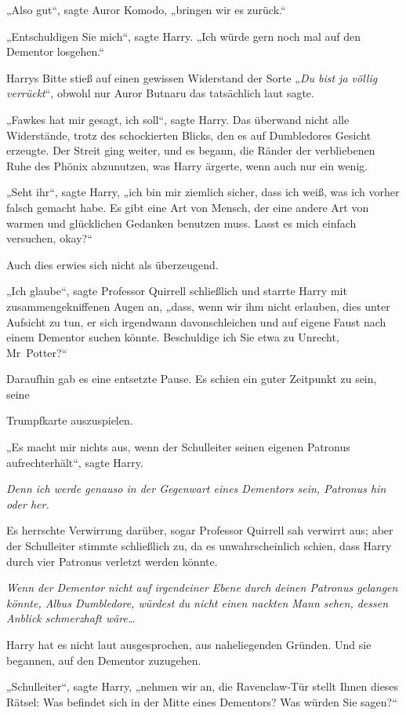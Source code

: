 {„Also gut“, sagte Auror Komodo, „bringen wir es zurück.“

„Entschuldigen Sie mich“, sagte Harry. „Ich würde gern noch mal auf den Dementor losgehen.“

Harrys Bitte stieß auf einen gewissen Widerstand der Sorte „\emph{Du bist ja völlig verrückt}“, obwohl nur Auror Butnaru das tatsächlich laut sagte.

„Fawkes hat mir gesagt, ich soll“, sagte Harry. Das überwand nicht alle Widerstände, trotz des schockierten Blicks, den es auf Dumbledores Gesicht erzeugte. Der Streit ging weiter, und es begann, die Ränder der verbliebenen Ruhe des Phönix abzunutzen, was Harry ärgerte, wenn auch nur ein wenig.

„Seht ihr“, sagte Harry, „ich bin mir ziemlich sicher, dass ich weiß, was ich vorher falsch gemacht habe. Es gibt eine Art von Mensch, der eine andere Art von warmen und glücklichen Gedanken benutzen muss. Lasst es mich einfach versuchen, okay?“

Auch dies erwies sich nicht als überzeugend.

„Ich glaube“, sagte Professor Quirrell schließlich und starrte Harry mit zusammengekniffenen Augen an, „dass, wenn wir ihm nicht erlauben, dies unter Aufsicht zu tun, er sich irgendwann davonschleichen und auf eigene Faust nach einem Dementor suchen könnte. Beschuldige ich Sie etwa zu Unrecht, Mr~Potter?“

Daraufhin gab es eine entsetzte Pause. Es schien ein guter Zeitpunkt zu sein, seine

Trumpfkarte auszuspielen.

„Es macht mir nichts aus, wenn der Schulleiter seinen eigenen Patronus aufrechterhält“, sagte Harry.

\emph{Denn ich werde genauso in der Gegenwart eines Dementors sein, Patronus hin oder her.}

Es herrschte Verwirrung darüber, sogar Professor Quirrell sah verwirrt aus; aber der Schulleiter stimmte schließlich zu, da es unwahrscheinlich schien, dass Harry durch vier Patronus verletzt werden könnte.

\emph{Wenn der Dementor nicht auf irgendeiner Ebene durch deinen Patronus gelangen könnte, Albus Dumbledore, würdest du nicht einen nackten Mann sehen, dessen Anblick schmerzhaft wäre…}

Harry hat es nicht laut ausgesprochen, aus naheliegenden Gründen. Und sie begannen, auf den Dementor zuzugehen.

„Schulleiter“, sagte Harry, „nehmen wir an, die Ravenclaw-Tür stellt Ihnen dieses Rätsel: Was befindet sich in der Mitte eines Dementors? Was würden Sie sagen?“

}
